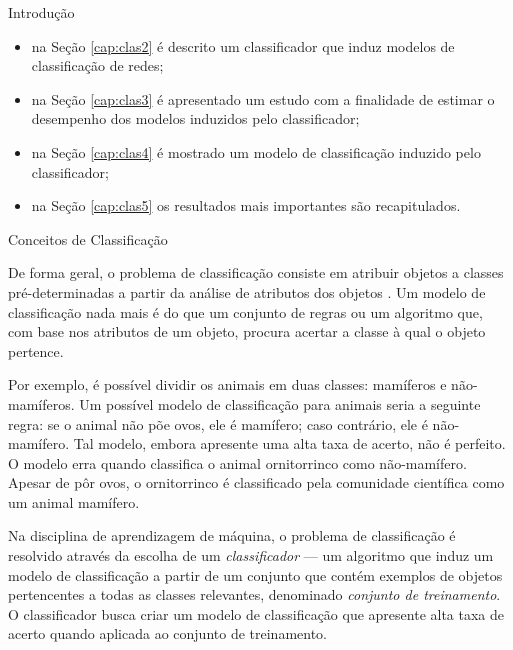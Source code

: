 \begin{section}{Introdução}
\begin{itemize}
		\item na Seção \ref{cap:clas2} é descrito um classificador que induz modelos de classificação de redes; %
		\item na Seção \ref{cap:clas3} é apresentado um estudo com a finalidade de estimar o desempenho dos modelos induzidos pelo classificador;
		\item na Seção \ref{cap:clas4} é mostrado um modelo de classificação induzido pelo classificador;
		\item na Seção \ref{cap:clas5} os resultados mais importantes são recapitulados.
	\end{itemize}	
	
\end{section}

\begin{section}{Conceitos de Classificação} \label{cap:clas1}
	
	De forma geral, o problema de classificação consiste em atribuir objetos a classes pré-determinadas a partir da análise de atributos dos objetos \cite{Tan2005}. Um modelo de classificação nada mais é do que um conjunto de regras ou um algoritmo que, com base nos atributos de um objeto, procura acertar a classe à qual o objeto pertence. 

	Por exemplo, é possível dividir os animais em duas classes: mamíferos e não-mamíferos. Um possível modelo de classificação para animais seria a seguinte regra: se o animal não põe ovos, ele é mamífero; caso contrário, ele é não-mamífero. Tal modelo, embora apresente uma alta taxa de acerto, não é perfeito. O modelo erra quando classifica o animal ornitorrinco como não-mamífero. Apesar de pôr ovos, o ornitorrinco é classificado pela comunidade científica como um animal mamífero.
	
	
	
	Na disciplina de aprendizagem de máquina, o problema de classificação é resolvido através da escolha de um \emph{classificador} --- um algoritmo que induz um modelo de classificação a partir de um conjunto que contém exemplos de objetos pertencentes a todas as classes relevantes, denominado \emph{conjunto de treinamento}. O classificador busca criar um modelo de classificação que apresente alta taxa de acerto quando aplicada ao conjunto de treinamento. 
	

\end{section}
